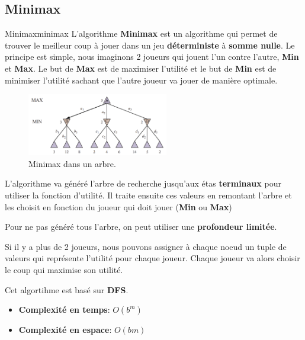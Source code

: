 \subsection{Minimax} %
\label{sub:minimax}

\begin{definition}{Minimax}{minimax}
    L'algorithme \textbf{Minimax} est un algorithme qui permet de trouver le meilleur coup à jouer dans un jeu \textbf{déterministe} à \textbf{somme nulle}.
    Le principe est simple, nous imaginons 2 joueurs qui jouent l'un contre l'autre, \textbf{Min} et \textbf{Max}.
    Le but de \textbf{Max} est de maximiser l'utilité et le but de \textbf{Min} est de minimiser l'utilité sachant 
    que l'autre joueur va jouer de manière optimale.
\end{definition}

\begin{figure}[H]
    \begin{center}
        \includegraphics[width=0.55\textwidth]{pictures/minimax.png}
    \end{center}
    \caption{Minimax dans un arbre.}\label{fig:minimaxtree}
\end{figure}


L'algorithme va généré l'arbre de recherche jusqu'aux étas \textbf{terminaux} pour utiliser la fonction d'utilité. 
Il traite ensuite ces valeurs en remontant l'arbre et les choisit en fonction du joueur qui doit jouer (\textbf{Min} ou \textbf{Max})
\begin{note}
    Pour ne pas généré tous l'arbre, on peut utiliser une \textbf{profondeur limitée}.
\end{note}

Si il y a plus de 2 joueurs, nous pouvons assigner à chaque noeud un tuple de valeurs qui représente l'utilité pour chaque joueur. 
Chaque joueur va alors choisir le coup qui maximise son utilité. 

\begin{remark}\leavevmode
    Cet algortihme est basé sur \textbf{DFS}. 
    \begin{itemize}
        \item \textbf{Complexité en temps}: $O(b^m)$
        \item \textbf{Complexité en espace}: $O(bm)$
    \end{itemize}
\end{remark}

